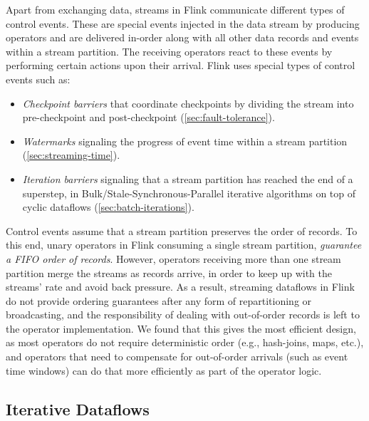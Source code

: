  Apart from exchanging data, streams in Flink communicate different types of control events. These are special events injected in the data stream by producing operators and are delivered in-order along with all other data records and events within a stream partition. The receiving operators react to these events by performing certain actions upon their arrival. Flink uses special types of control events such as: \vspace{-2mm}
\begin{itemize}
\item \textit{Checkpoint barriers} that coordinate checkpoints by dividing the stream into pre-checkpoint and post-checkpoint (\autoref{sec:fault-tolerance}). \vspace{-3mm}
\item \textit{Watermarks} signaling the progress of event time within a stream partition (\autoref{sec:streaming-time}). \vspace{-3mm}
\item \textit{Iteration barriers} signaling that a stream partition has reached the end of a superstep, in Bulk/Stale-Synchronous-Parallel iterative algorithms on top of cyclic dataflows (\autoref{sec:batch-iterations}). \vspace{-1mm}
\end{itemize}

Control events assume that a stream partition preserves the order of records. To this end, unary operators in Flink consuming a single stream partition, \emph{guarantee a FIFO order of records}. However, operators receiving more than one stream partition merge the streams as records arrive, in order to keep up with the streams' rate and avoid back pressure. As a result, streaming dataflows in Flink do not provide ordering guarantees after any form of repartitioning or broadcasting, and the responsibility of dealing with out-of-order records is left to the operator implementation. We found that this gives the most efficient design, as most operators do not require deterministic order (e.g., hash-joins, maps, etc.), and operators that need to compensate for out-of-order arrivals (such as event time windows) can do that more efficiently as part of the operator logic.

\subsection{Iterative Dataflows}


